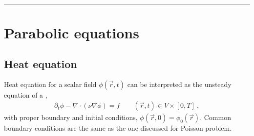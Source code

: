 \documentclass[letterpaper,10pt,english]{jupyterBook}
\begin{document}
\bigskip\hrule\bigskip


\sphinxstepscope


\chapter{Parabolic equations}
\label{\detokenize{ch/pde/parabolic:parabolic-equations}}\label{\detokenize{ch/pde/parabolic:pde-parabolic}}\label{\detokenize{ch/pde/parabolic::doc}}

\section{Heat equation}
\label{\detokenize{ch/pde/parabolic:heat-equation}}\label{\detokenize{ch/pde/parabolic:pde-parabolic-heat}}
\sphinxAtStartPar
Heat equation for a scalar field \(\phi(\vec{r},t)\) can be interpreted as the unsteady equation of a {\hyperref[\detokenize{ch/pde/elliptic:pde-elliptic-poisson}]{}},
\begin{equation*}
\begin{split}\partial_t \phi - \nabla \cdot (\nu \nabla \phi) = f \qquad (\vec{r}, t) \in V \times [0, T] \ ,\end{split}
\end{equation*}
\sphinxAtStartPar
with proper boundary and initial conditions, \(\phi(\vec{r},0) = \phi_0(\vec{r})\). Common boundary conditions are the same as the one discussed for Poisson problem.
\end{document}
